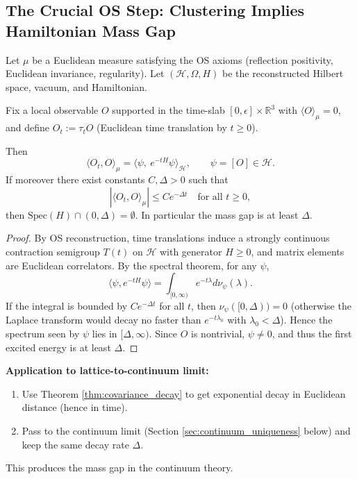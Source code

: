 \subsection{The Crucial OS Step: Clustering Implies Hamiltonian Mass Gap}

\begin{theorem}
\label{thm:os_mass_gap}
Let $\mu$ be a Euclidean measure satisfying the OS axioms (reflection positivity, Euclidean invariance, regularity). Let $(\mathcal H,\Omega,H)$ be the reconstructed Hilbert space, vacuum, and Hamiltonian.

Fix a local observable $O$ supported in the time-slab $[0,\epsilon]\times \mathbb R^3$ with $\langle O\rangle_\mu=0$, and define $O_t:=\tau_t O$ (Euclidean time translation by $t\ge0$).

Then
\begin{equation}
\langle O_t,O\rangle_\mu = \langle \psi,\ e^{-tH}\psi\rangle_{\mathcal H},
\qquad \psi=[O]\in\mathcal H.
\end{equation}
If moreover there exist constants $C,\Delta>0$ such that
\begin{equation}
|\langle O_t,O\rangle_\mu| \le C e^{-\Delta t}\quad\text{for all }t\ge0,
\end{equation}
then $\mathrm{Spec}(H)\cap(0,\Delta)=\emptyset$. In particular the mass gap is at least $\Delta$.
\end{theorem}

\begin{proof}
By OS reconstruction, time translations induce a strongly continuous contraction semigroup $T(t)$ on $\mathcal H$ with generator $H\ge0$, and matrix elements are Euclidean correlators. By the spectral theorem, for any $\psi$,
\begin{equation}
\langle \psi,e^{-tH}\psi\rangle = \int_{[0,\infty)} e^{-t\lambda}d\nu_\psi(\lambda).
\end{equation}
If the integral is bounded by $C e^{-\Delta t}$ for all $t$, then $\nu_\psi([0,\Delta))=0$ (otherwise the Laplace transform would decay no faster than $e^{-t\lambda_0}$ with $\lambda_0<\Delta$). Hence the spectrum seen by $\psi$ lies in $[\Delta,\infty)$. Since $O$ is nontrivial, $\psi\neq0$, and thus the first excited energy is at least $\Delta$.
\end{proof}

\textbf{Application to lattice-to-continuum limit:}
\begin{enumerate}
    \item Use Theorem \ref{thm:covariance_decay} to get exponential decay in Euclidean distance (hence in time).
    \item Pass to the continuum limit (Section \ref{sec:continuum_uniqueness} below) and keep the same decay rate $\Delta$.
\end{enumerate}
This produces the mass gap in the continuum theory.

